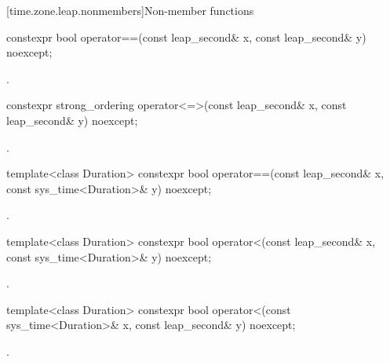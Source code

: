 [time.zone.leap.nonmembers]{Non-member functions}

%
\begin{itemdecl}
constexpr bool operator==(const leap_second& x, const leap_second& y) noexcept;
\end{itemdecl}

\begin{itemdescr}
\pnum
\returns
{}.
\end{itemdescr}

%
\begin{itemdecl}
constexpr strong_ordering operator<=>(const leap_second& x, const leap_second& y) noexcept;
\end{itemdecl}

\begin{itemdescr}
\pnum
\returns
{}.
\end{itemdescr}

%
%
\begin{itemdecl}
template<class Duration>
  constexpr bool operator==(const leap_second& x, const sys_time<Duration>& y) noexcept;
\end{itemdecl}

\begin{itemdescr}
\pnum
\returns
{}.
\end{itemdescr}

%
%
\begin{itemdecl}
template<class Duration>
  constexpr bool operator<(const leap_second& x, const sys_time<Duration>& y) noexcept;
\end{itemdecl}

\begin{itemdescr}
\pnum
\returns
{}.
\end{itemdescr}

%
%
\begin{itemdecl}
template<class Duration>
  constexpr bool operator<(const sys_time<Duration>& x, const leap_second& y) noexcept;
\end{itemdecl}

\begin{itemdescr}
\pnum
\returns
{}.
\end{itemdescr}

